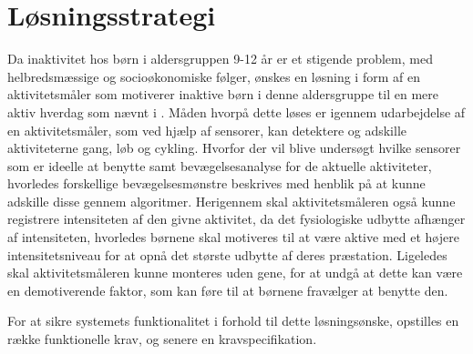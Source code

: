 \section{Løsningsstrategi}


%



Da inaktivitet hos børn i aldersgruppen 9-12 år er et stigende problem, med helbredsmæssige og socioøkonomiske følger, ønskes en løsning i form af en aktivitetsmåler som motiverer inaktive børn i denne aldersgruppe til en mere aktiv hverdag som nævnt i . 
Måden hvorpå dette løses er igennem udarbejdelse af en aktivitetsmåler, som ved hjælp af sensorer, kan detektere og adskille aktiviteterne gang, løb og cykling. Hvorfor der vil blive undersøgt hvilke sensorer som er ideelle at benytte samt bevægelsesanalyse for de aktuelle aktiviteter, hvorledes forskellige bevægelsesmønstre beskrives med henblik på at kunne adskille disse gennem algoritmer. Herigennem skal aktivitetsmåleren også kunne registrere intensiteten af den givne aktivitet, da det fysiologiske udbytte afhænger af intensiteten, hvorledes børnene skal motiveres til at være aktive med et højere intensitetsniveau for at opnå det største udbytte af deres præstation. 
Ligeledes skal aktivitetsmåleren kunne monteres uden gene, for at undgå at dette kan være en demotiverende faktor, som kan føre til at børnene fravælger at benytte den. 

For at sikre systemets funktionalitet i forhold til dette løsningsønske, opstilles en række funktionelle krav, og senere en kravspecifikation.  



   